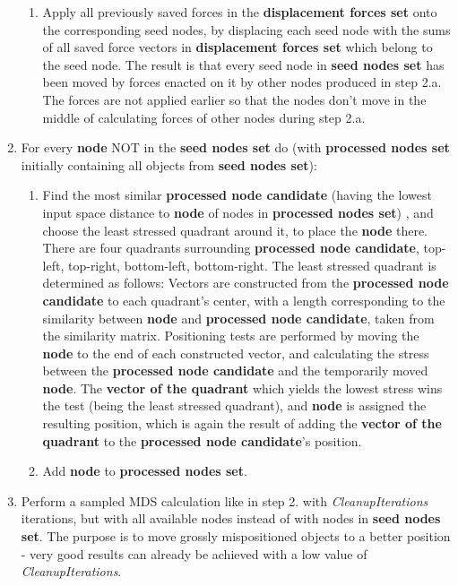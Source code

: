 \begin{enumerate}
\begin{enumerate}
			\item Apply all previously saved forces in the \textbf{displacement forces set} onto the corresponding seed nodes, by displacing each seed node with the sums of all saved force vectors in \textbf{displacement forces set} which belong to the seed node. The result is that every seed node in \textbf{seed nodes set} has been moved by forces enacted on it by other nodes produced in step 2.a. The forces are not applied earlier so that the nodes don't move in the middle of calculating forces of other nodes during step 2.a.
		\end{enumerate}
	\item For every \textbf{node} NOT in the \textbf{seed nodes set} do (with \textbf{processed nodes set} initially containing all objects from \textbf{seed nodes set}):
		\begin{enumerate}
			\item Find the most similar \textbf{processed node candidate} (having the lowest input space distance to \textbf{node} of nodes in \textbf{processed nodes set}) , and choose the least stressed quadrant around it, to place the \textbf{node} there. There are four quadrants surrounding \textbf{processed node candidate}, top-left, top-right, bottom-left, bottom-right. The least stressed quadrant is determined as follows:
				\subitem Vectors are constructed from the \textbf{processed node candidate} to each quadrant's center, with a length corresponding to the similarity between \textbf{node} and \textbf{processed node candidate}, taken from the similarity matrix.
				\subitem Positioning tests are performed by moving the \textbf{node} to the end of each constructed vector, and calculating the stress between the \textbf{processed node candidate} and the temporarily moved \textbf{node}. The \textbf{vector of the quadrant} which yields the lowest stress wins the test (being the least stressed quadrant), and \textbf{node} is assigned the resulting position, which is again the result of adding the \textbf{vector of the quadrant} to the \textbf{processed node candidate}'s position.
			\item Add \textbf{node} to \textbf{processed nodes set}.
		\end{enumerate}
	\item Perform a sampled MDS calculation like in step 2. with \emph{CleanupIterations} iterations, but with all available nodes instead of with nodes in \textbf{seed nodes set}. The purpose is to move grossly mispositioned objects to a better position - very good results can already be achieved with a low value of \emph{CleanupIterations}.
		
\end{enumerate}

